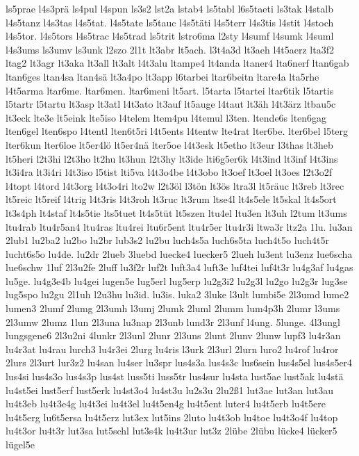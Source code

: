 {ls5prae
l4s3prä
ls4pul
l4spun
ls3s2
lst2a
lstab4
ls5tabl
l6s5taeti
ls3tak
l4stalb
l4s5tanz
l4s3tas
l4s5tat.
l4s5tate
ls5tauc
l4s5täti
l4s5terr
l4s3tis
l4stit
l4stoch
l4s5tor.
l4s5tors
l4s5trac
l4s5trad
ls5trit
lstro6ma
l2sty
l4sumf
l4sumk
l4suml
l4s3ums
ls3umv
ls3unk
l2szo
2l1t
lt3abr
lt5ach.
l3t4a3d
lt3aeh
l4t5aerz
lta3f2
ltag2
lt3agr
lt3aka
lt3all
lt3alt
l4t3alu
ltampe4
lt4anda
ltaner4
lta6nerf
ltan6gab
ltan6ges
ltan4sa
ltan4sä
lt3a4po
lt3app
l6tarbei
ltar6beitn
ltare4a
lta5rhe
l4t5arma
ltar6me.
ltar6men.
ltar6meni
lt5art.
l5tarta
l5tartei
ltar6tik
l5tartis
l5tartr
l5tartu
lt3asp
lt3atl
l4t3ato
lt3auf
lt5auge
l4taut
lt3äh
l4t3ärz
ltbau5c
lt3eck
lte3e
lt5eink
lte5iso
l4telem
ltem4pu
l4temul
l3ten.
ltende6s
lten6gag
lten6gel
lten6spo
l4tentl
lten6t5ri
l4t5ents
l4tentw
lte4rat
lter6be.
lter6bel
l5terg
lter6kun
lter6loe
lt5er4lö
lt5er4nä
lter5oe
l4t3esk
lt5etho
lt3eur
l3thas
lt3heb
lt5heri
l2t3hi
l2t3ho
lt2hu
lt3hun
l2t3hy
lt3ide
lti6g5er6k
l4t3ind
lt3inf
l4t3ins
lt3i4ra
lt3i4ri
l4t3iso
l5tist
lti5va
l4t3o4be
l4t3obo
lt3oef
lt3oel
lt3oes
l2t3o2f
l4topt
l4tord
l4t3org
l4t3o4ri
lto2w
l2t3öl
l3tön
lt3ös
ltra3l
lt5räuc
lt3reb
lt3rec
lt5reic
lt5reif
l4trig
l4t3ris
l4t3roh
lt3ruc
lt3rum
ltse4l
lt4s5ele
lt5skal
lt4s5ort
lt3s4ph
lt4staf
lt4s5tie
lts5tuet
lt4s5tüt
lt5szen
ltu4el
ltu3en
lt3uh
l2tum
lt3ums
ltu4rab
ltu4r5an4
ltu4ras
ltu4rei
ltu6r5ent
ltu4r5er
ltu4r3i
ltwa3r
ltz2a
1lu.
lu3an
2lub1
lu2ba2
lu2bo
lu2br
lub3s2
lu2bu
luch4s5a
luch6s5ta
luch4t5o
luch4t5r
lucht6s5o
lu4de.
lu2dr
2lueb
3luebd
luecke4
luecker5
2lueh
lu3ent
lu3enz
lue6scha
lue6schw
1luf
2l3u2fe
2luff
lu3f2r
luf2t
luft3a4
luft3e
luf4tei
luf4t3r
lu4g3af
lu4gas
lu5ge.
lu4g3e4b
lu4gei
lugen5e
lug5erl
lug5erp
lu2g3i2
lu2g3l
lu2go
lu2g3r
lug3se
lug5spo
lu2gu
2l1uh
l2u3hu
lu3id.
lu3is.
luka2
3luke
l3ult
lumbi5e
2l3umd
lume2
lumen3
2lumf
2lumg
2l3umh
l3umj
2lumk
2luml
2lumm
lum4p3h
2lumr
l3ums
2l3umw
2lumz
1lun
2l3una
lu3nap
2l3unb
lund3r
2l3unf
l4ung.
5lunge.
4l3ungl
lungsgene6
2l3u2ni
4lunkr
2l3unl
2lunr
2l3uns
2lunt
2lunv
2lunw
lupf3
lu4r3an
lu4r3at
lu4rau
lurch3
lu4r3ei
2lurg
lu4ris
l3urk
2l3url
2lurn
luro2
lu4rof
lu4ror
2lurs
2l3urt
lur3z2
lu4san
lu4ser
lu3spr
lus4s3a
lus4s3c
lus6sein
lus4s5el
lus4s5er4
lus4si
lus4s3o
lus4s3p
lus4st
luss5ti
luss5tr
lus4sur
lu4sta
lust5ae
lust5ak
lu4stä
lu4st5ei
lust5erf
lust5erk
lu4st3o4
lu4st3u
lu2s3u
2lu2ß1
lut3ae
lut3an
lut3au
lu4t3eb
lu4t3e4g
lu4t3ei
lu4t3el
lu4t5en4g
lu4t5ent
luter4
lu4t5erb
lu4t5ere
lu4t5erg
lu6t5ersa
lu4t5erz
lut3ex
lut5ins
2luto
lu4t3ob
lu4toe
lu4t3o4f
lu4top
lu4t3or
lu4t3r
lut3sa
lut5schl
lut3s4k
lu4t3ur
lut3z
2lübe
2lübu
lücke4
lücker5
lügel5e
}

